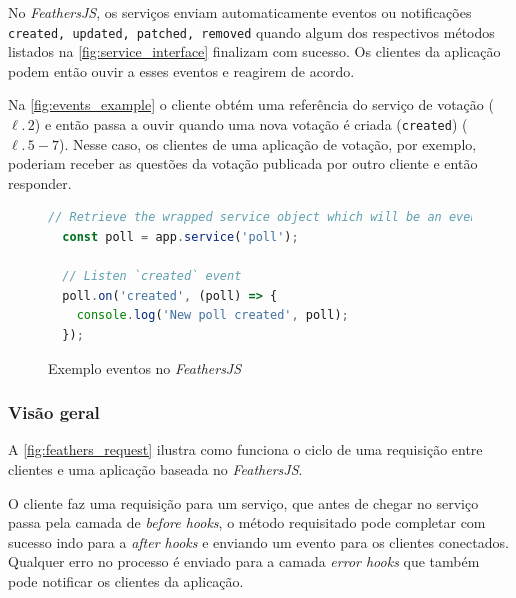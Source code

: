 No \textit{\textit{FeathersJS}}, os serviços enviam automaticamente eventos ou notificações
\texttt{created, updated, patched, removed} quando algum dos respectivos métodos listados
na \autoref{fig:service_interface} finalizam com sucesso.
Os clientes da aplicação podem então ouvir a esses eventos e reagirem de acordo.

Na \autoref{fig:events_example} o cliente obtém uma referência do serviço
de votação ($\ell.\,2$) e então passa a ouvir quando uma nova votação é criada (\texttt{created}) ($\ell.\,5-7$).
Nesse caso, os clientes de uma aplicação de votação, por exemplo, poderiam
receber as questões da votação publicada por outro cliente e então responder.

\begin{figure}[h]
\caption{Exemplo eventos no \textit{\textit{FeathersJS}}}
\label{fig:events_example}
\begin{lstlisting}[language=JavaScript]
  // Retrieve the wrapped service object which will be an event emitter
  const poll = app.service('poll');

  // Listen `created` event
  poll.on('created', (poll) => {
    console.log('New poll created', poll);
  });
\end{lstlisting}
\doautor
\end{figure}

\subsubsection{Visão geral}

A \autoref{fig:feathers_request} ilustra como funciona o ciclo de uma requisição
entre clientes e uma aplicação baseada no \textit{FeathersJS}.

O cliente faz uma requisição para um serviço, que antes de chegar no serviço passa
pela camada de \textit{before hooks}, o método requisitado pode completar com sucesso indo para a
\textit{after hooks} e enviando um evento para os clientes conectados. Qualquer erro no processo
é enviado para a camada \textit{error hooks} que também pode notificar os clientes da aplicação.

